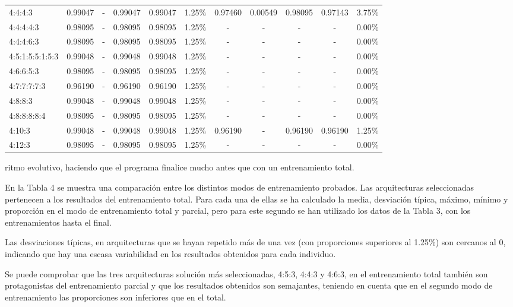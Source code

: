 \documentclass[spanish,a4paper,12pt,twoside]{report}
\begin{document}
\begin{landscape}
\begin{center}
\begin{tabular}{l c c c c r c c c c r}
        4:4:4:3 & 0.99047 & - & 0.99047 & 0.99047 & 1.25\% & 0.97460 & 0.00549 & 0.98095 & 0.97143 & 3.75\% \\
        4:4:4:4:3 & 0.98095 & - & 0.98095 & 0.98095 & 1.25\% & - & - & - & - & 0.00\% \\
        4:4:4:6:3 & 0.98095 & - & 0.98095 & 0.98095 & 1.25\% & - & - & - & - & 0.00\% \\
        4:5:1:5:5:1:5:3 & 0.99048 & - & 0.99048 & 0.99048 & 1.25\% & - & - & - & - & 0.00\% \\
        4:6:6:5:3 & 0.98095 & - & 0.98095 & 0.98095 & 1.25\% & - & - & - & - & 0.00\% \\
        4:7:7:7:7:3 & 0.96190 & - & 0.96190 & 0.96190 & 1.25\% & - & - & - & - & 0.00\% \\ 
        4:8:8:3 & 0.99048 & - & 0.99048 & 0.99048 & 1.25\% & - & - & - & - & 0.00\% \\
        4:8:8:8:8:4 & 0.98095 & - & 0.98095 & 0.98095 & 1.25\% & - & - & - & - & 0.00\% \\
        4:10:3 & 0.99048 & - & 0.99048 & 0.99048 & 1.25\% & 0.96190 & - & 0.96190 & 0.96190 & 1.25\% \\
        4:12:3 & 0.98095 & - & 0.98095 & 0.98095 & 1.25\% & - & - & - & - & 0.00\% \\[1ex]
        \hline
      \end{tabular}
    \end{center}
  \end{landscape}
  \noindent ritmo evolutivo, haciendo que el programa finalice mucho antes que con un entrenamiento total. \par
  En la Tabla 4 se muestra una comparación entre los distintos modos de entrenamiento probados. Las arquitecturas seleccionadas pertenecen a los resultados del entrenamiento total. Para cada una de ellas se ha calculado la media, desviación típica, máximo, mínimo y proporción en el modo de entrenamiento total y parcial, pero para este segundo se han utilizado los datos de la Tabla 3, con los entrenamientos hasta el final. \par
  Las desviaciones típicas, en arquitecturas que se hayan repetido más de una vez (con proporciones superiores al 1.25\%) son cercanos al 0, indicando que hay una escasa variabilidad en los resultados obtenidos para cada individuo.\par
  Se puede comprobar que las tres arquitecturas solución más seleccionadas, 4:5:3, 4:4:3 y 4:6:3, en el entrenamiento total también son protagonistas del entrenamiento parcial y que los resultados obtenidos son semajantes, teniendo en cuenta que en el segundo modo de entrenamiento las proporciones son inferiores que en el total. \par
\end{document}
